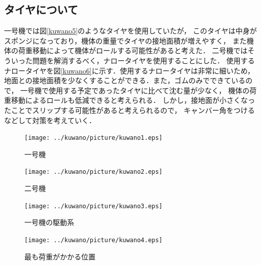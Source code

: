 \subsection{タイヤについて}
一号機では図\ref{kuwano5}のようなタイヤを使用していたが，
このタイヤは中身がスポンジになっており，機体の重量でタイヤの接地面積が増えやすく，
また機体の荷重移動によって機体がロールする可能性があると考えた．
二号機ではそういった問題を解消するべく，ナロータイヤを使用することにした．
使用するナロータイヤを図\ref{kuwano6}に示す．使用するナロータイヤは非常に細いため，
地面との接地面積を少なくすることができる．また，ゴムのみでできているので，
一号機で使用する予定であったタイヤに比べて沈む量が少なく，
機体の荷重移動によるロールも低減できると考えられる．
しかし，接地面が小さくなったことでスリップする可能性があると考えられるので，
キャンバー角をつけるなどして対策を考えていく．

\begin{figure}[t]
  \begin{center}
    \texttt{[image: ../kuwano/picture/kuwano1.eps]}
    \caption{一号機}
    \label{kuwano1}
  \end{center}
\end{figure}

\begin{figure}[t]
  \begin{center}
    \texttt{[image: ../kuwano/picture/kuwano2.eps]}
    \caption{二号機}
    \label{kuwano2}
  \end{center}
\end{figure}

\begin{figure}[t]
  \begin{center}
    \texttt{[image: ../kuwano/picture/kuwano3.eps]}
    \caption{一号機の駆動系}
    \label{kuwano3}
  \end{center}
\end{figure}

\begin{figure}[t]
  \begin{center}
    \texttt{[image: ../kuwano/picture/kuwano4.eps]}
    \caption{最も荷重がかかる位置}
    \label{kuwano4}
  \end{center}
\end{figure}

